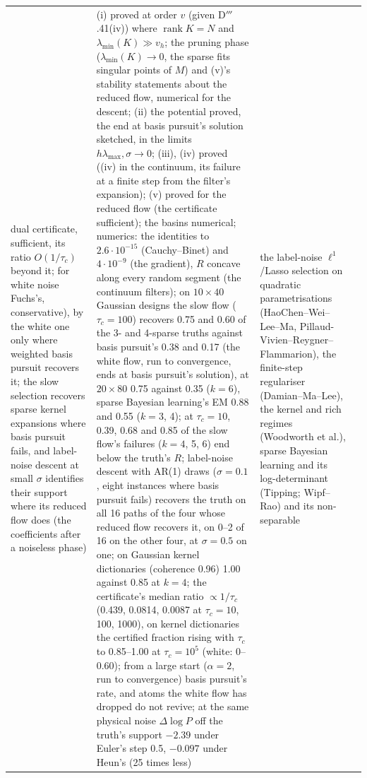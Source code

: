 {\begin{longtable}{@{}>{\raggedright\arraybackslash}p{}>{\raggedright\arraybackslash}p{}%
>{\raggedright\arraybackslash}p{}>{\raggedright\arraybackslash}p{}@{}}
dual certificate, sufficient, its ratio $O(1/\tau_c)$ beyond it; for white noise Fuchs's, conservative), by the white
one only where weighted basis pursuit recovers it; the slow selection recovers sparse kernel expansions where basis
pursuit fails, and label-noise descent at small $\sigma$ identifies their support where its reduced flow does (the
coefficients after a noiseless phase)
& (i) proved at order $v$ (given D$'''$.41(iv)) where $\operatorname{rank}K = N$ and $\lambda_{\min}(K)\gg v_h$; the
pruning phase ($\lambda_{\min}(K)\to0$, the sparse fits singular points of $M$) and (v)'s stability statements about the
reduced flow, numerical for the descent; (ii) the potential proved, the end at basis pursuit's solution sketched, in the
limits $h\lambda_{\max},\sigma\to0$; (iii), (iv) proved ((iv) in the continuum, its failure at a finite step from the
filter's expansion); (v) proved for the reduced flow (the certificate sufficient); the basins numerical; numerics: the
identities to $2.6\cdot10^{-15}$ (Cauchy--Binet) and $4\cdot10^{-9}$ (the gradient), $R$ concave along every random
segment (the continuum filters); on $10\times40$ Gaussian designs the slow flow ($\tau_c = 100$) recovers 0.75 and 0.60
of the 3- and 4-sparse truths against basis pursuit's 0.38 and 0.17 (the white flow, run to convergence, ends at basis
pursuit's solution), at $20\times80$ 0.75 against 0.35 ($k = 6$), sparse Bayesian learning's EM 0.88 and 0.55 ($k = 3$,
4); at $\tau_c = 10$, 0.39, 0.68 and 0.85 of the slow flow's failures ($k = 4$, 5, 6) end below the truth's $R$;
label-noise descent with AR(1) draws ($\sigma = 0.1$, eight instances where basis pursuit fails) recovers the truth on
all 16 paths of the four whose reduced flow recovers it, on 0--2 of 16 on the other four, at $\sigma = 0.5$ on one; on
Gaussian kernel dictionaries (coherence 0.96) 1.00 against 0.85 at $k = 4$; the certificate's median ratio
$\propto1/\tau_c$ (0.439, 0.0814, 0.0087 at $\tau_c = 10$, 100, 1000), on kernel dictionaries the certified fraction
rising with $\tau_c$ to 0.85--1.00 at $\tau_c = 10^5$ (white: 0--0.60); from a large start ($\alpha = 2$, run to
convergence) basis pursuit's rate, and atoms the white flow has dropped do not revive; at the same physical noise
$\Delta\log P$ off the truth's support $-2.39$ under Euler's step 0.5, $-0.097$ under Heun's (25 times less)
& the label-noise $\ell^1$/Lasso selection on quadratic parametrisations (HaoChen--Wei--Lee--Ma,
Pillaud-Vivien--Reygner--Flammarion), the finite-step regulariser (Damian--Ma--Lee), the kernel and rich regimes
(Woodworth et al.), sparse Bayesian learning and its log-determinant (Tipping; Wipf--Rao) and its non-separable

\end{longtable}}
